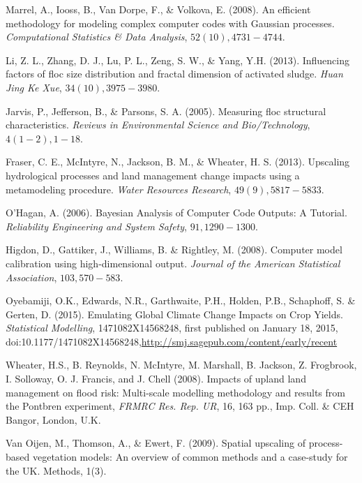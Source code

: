 \documentclass[12pt,titlepage]{report}
\theoremstyle{definition}
\theoremstyle{remark}
\begin{document}
\begin{thebibliography}{94}

 Marrel, A., Iooss, B., Van Dorpe, F., \& Volkova, E. (2008). An efficient methodology for modeling complex computer codes with Gaussian processes. {\it Computational Statistics \& Data Analysis}, $52(10), 4731-4744$.

 Li, Z. L., Zhang, D. J., Lu, P. L., Zeng, S. W., \& Yang, Y.H. (2013). Influencing factors of floc size distribution and fractal dimension of activated sludge. {\it Huan Jing Ke Xue}, $34(10), 3975-3980$.

 Jarvis, P., Jefferson, B., \& Parsons, S. A. (2005). Measuring floc structural characteristics. {\it Reviews in Environmental Science and Bio/Technology}, $4(1-2), 1-18$.

  Fraser, C. E., McIntyre, N., Jackson, B. M., \& Wheater, H. S. (2013). Upscaling hydrological processes and land management change impacts using a metamodeling procedure. {\it Water Resources Research}, $49(9), 5817-5833$.

 O'Hagan, A. (2006). Bayesian Analysis of Computer Code Outputs: A Tutorial. {\it Reliability Engineering and System Safety}, $91, 1290-1300$.

 Higdon, D., Gattiker, J., Williams, B. \& Rightley, M. (2008). Computer model calibration using high-dimensional output. {\it Journal of the American Statistical Association}, $103, 570-583$.

  Oyebamiji, O.K., Edwards, N.R., Garthwaite, P.H., Holden, P.B., Schaphoff, S. \& Gerten, D. (2015). Emulating Global Climate Change Impacts on Crop Yields. {\it Statistical Modelling}, 1471082X14568248, first published on January 18, 2015, doi:10.1177/1471082X14568248,\href{http://smj.sagepub.com/content/early/recent}{http://smj.sagepub.com/content/early/recent}
 
  Wheater, H.S., B. Reynolds, N. McIntyre, M. Marshall, B. Jackson, Z. Frogbrook, I. Solloway, O. J. Francis, and J. Chell (2008). Impacts of upland land management on flood risk: Multi-scale modelling methodology and results from the Pontbren experiment, {\it FRMRC Res. Rep. UR}, 16, 163 pp., Imp. Coll. \& CEH Bangor, London, U.K.
 
  Van Oijen, M., Thomson, A., \& Ewert, F. (2009). Spatial upscaling of process-based vegetation models: An overview of common methods and a case-study for the UK. Methods, 1(3).
 

\end{thebibliography}
\end{document}
